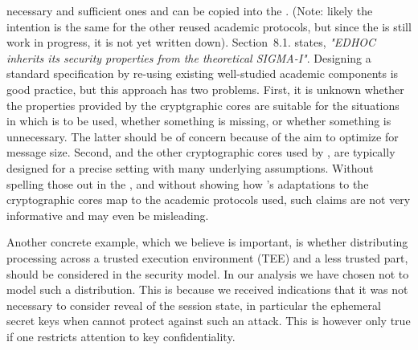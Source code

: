 \documentclass[runningheads,draft,x11names]{llncs}
\begin{document}
necessary and sufficient ones and can be copied into the \mSpec.
%
(Note: likely the intention is the same for the other reused academic protocols,
but since the \mSpec{} is still work in progress, it is not yet written
down).
%
Section~8.1. states, \emph{"EDHOC inherits its security properties
from the theoretical SIGMA-I"}.
%
Designing a standard specification by re-using existing well-studied academic
components is good practice, but this approach has two problems.
%
First, it is unknown whether the properties provided by the cryptgraphic cores
are suitable for the situations in which \mEdhoc{} is to be used, whether
something is missing, or whether something is unnecessary.
%
The latter should be of concern because of the aim to optimize \mEdhoc{} for
message size. 
%
Second, \mSigma{} and the other cryptographic cores used by \mEdhoc, are
typically designed for a precise setting with many underlying assumptions.
%
Without spelling those out in the \mSpec, and without showing how
\mEdhoc's adaptations to the cryptographic cores map to the academic protocols
used, such claims are not very informative and may even be misleading.
%

Another concrete example, which we believe is important, is whether distributing
\mEdhoc{} processing across a trusted execution environment (TEE) and a less
trusted part, should be considered in the security model.
%
In our analysis we have chosen not to model such a distribution.
%
This is because we received indications that it was not necessary to consider
reveal of the session state, in particular the ephemeral secret keys when
\mSigma{} cannot protect against such an attack.
%
This is however only true if one restricts attention to key confidentiality.
%
\end{document}
